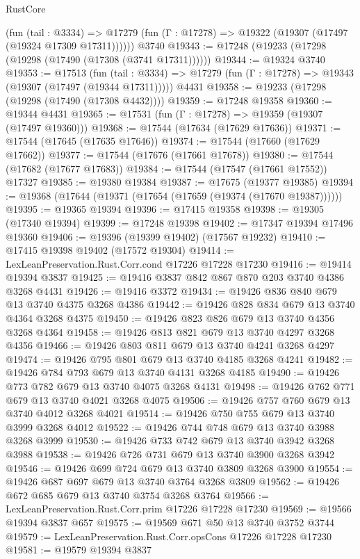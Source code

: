 \begin{lexlean}{RustCore}
\begin{coremodule}
      (fun (tail : @3334) =>
      @17279 (fun (Γ : @17278) => @19322 (@19307 (@17497 (@19324 @17309 @17311))))))
    @3740
@19343 := @17248 (@19233 (@17298 (@19298 (@17490 (@17308 (@3741 @17311))))))
@19344 := @19324 @3740
@19353 := @17513
    (fun (tail : @3334) => @17279 (fun (Γ : @17278) => @19343 (@19307 (@17497 (@19344 @17311)))))
    @4431
@19358 := @19233 (@17298 (@19298 (@17490 (@17308 @4432))))
@19359 := @17248 @19358
@19360 := @19344 @4431
@19365 := @17531 (fun (Γ : @17278) => @19359 (@19307 (@17497 @19360)))
@19368 := @17544 (@17634 (@17629 @17636))
@19371 := @17544 (@17645 (@17635 @17646))
@19374 := @17544 (@17660 (@17629 @17662))
@19377 := @17544 (@17676 (@17661 @17678))
@19380 := @17544 (@17682 (@17677 @17683))
@19384 := @17544 (@17547 (@17661 @17552)) @17327
@19385 := @19380 @19384
@19387 := @17675 (@19377 @19385)
@19394 := @19368 (@17644 (@19371 (@17654 (@17659 (@19374 (@17670 @19387))))))
@19395 := @19365 @19394
@19396 := @17415 @19358
@19398 := @19305 (@17340 @19394)
@19399 := @17248 @19398
@19402 := @17347 @19394 @17496 @19360
@19406 := @19396 (@19399 @19402) (@17567 @19232)
@19410 := @17415 @19398 @19402 (@17572 @19304)
@19414 := LexLeanPreservation.Rust.Corr.cond @17226 @17228 @17230
@19416 := @19414 @19394 @3837
@19425 := @19416 @3837 @842 @867 @870 @203 @3740 @4386 @3268 @4431
@19426 := @19416 @3372
@19434 := @19426 @836 @840 @679 @13 @3740 @4375 @3268 @4386
@19442 := @19426 @828 @834 @679 @13 @3740 @4364 @3268 @4375
@19450 := @19426 @823 @826 @679 @13 @3740 @4356 @3268 @4364
@19458 := @19426 @813 @821 @679 @13 @3740 @4297 @3268 @4356
@19466 := @19426 @803 @811 @679 @13 @3740 @4241 @3268 @4297
@19474 := @19426 @795 @801 @679 @13 @3740 @4185 @3268 @4241
@19482 := @19426 @784 @793 @679 @13 @3740 @4131 @3268 @4185
@19490 := @19426 @773 @782 @679 @13 @3740 @4075 @3268 @4131
@19498 := @19426 @762 @771 @679 @13 @3740 @4021 @3268 @4075
@19506 := @19426 @757 @760 @679 @13 @3740 @4012 @3268 @4021
@19514 := @19426 @750 @755 @679 @13 @3740 @3999 @3268 @4012
@19522 := @19426 @744 @748 @679 @13 @3740 @3988 @3268 @3999
@19530 := @19426 @733 @742 @679 @13 @3740 @3942 @3268 @3988
@19538 := @19426 @726 @731 @679 @13 @3740 @3900 @3268 @3942
@19546 := @19426 @699 @724 @679 @13 @3740 @3809 @3268 @3900
@19554 := @19426 @687 @697 @679 @13 @3740 @3764 @3268 @3809
@19562 := @19426 @672 @685 @679 @13 @3740 @3754 @3268 @3764
@19566 := LexLeanPreservation.Rust.Corr.prim @17226 @17228 @17230
@19569 := @19566 @19394 @3837 @657
@19575 := @19569 @671 @50 @13 @3740 @3752 @3744
@19579 := LexLeanPreservation.Rust.Corr.opsCons @17226 @17228 @17230
@19581 := @19579 @19394 @3837

\end{coremodule}
\end{lexlean}
